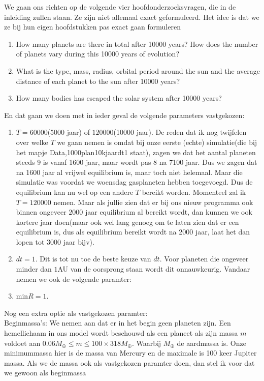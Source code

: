 \documentclass[11pt]{article}
\begin{document}
We gaan ons richten op de volgende vier hoofdonderzoeksvragen, die in de inleiding zullen staan. Ze zijn niet allemaal exact geformuleerd. Het idee is dat we ze bij hun eigen hoofdstukken pas exact gaan formuleren\\
\begin{enumerate}
	\item  How many planets are there in total after 10000 years? How does the number of planets vary during this 10000 years of evolution?

	\item What is the type, mass, radius, orbital period around the sun and the average distance of each planet to the sun after 10000 years?

	\item How many bodies has escaped the solar system after 10000 years?
\end{enumerate}
En dat gaan we doen met in ieder geval de volgende parameters vastgekozen:
\begin{enumerate}
\item $T=60000$(5000 jaar) of $120000$(10000 jaar). De reden dat ik nog twijfelen over welke $T$ we gaan nemen is omdat bij onze eerste (echte) simulatie(die bij het mapje Data,1000plan10kjaardt1 staat), zagen we dat het aantal planeten steeds 9 is vanaf 1600 jaar, maar wordt pas 8 na 7100 jaar. Dus we zagen dat na 1600 jaar al vrijwel equilibrium is, maar toch niet helemaal. Maar die simulatie was voordat we woensdag gasplaneten hebben toegevoegd. Dus de equilibrium kan nu wel op een andere $T$ bereikt worden. Momenteel zal ik $T=120000$ nemen. Maar als jullie zien dat er bij ons nieuw programma ook binnen ongeveer $2000$ jaar equilibrium al bereikt wordt, dan kunnen we ook kortere jaar doen(maar ook wel lang genoeg om te laten zien dat er een equilibrium is, dus als equilibrium bereikt wordt na 2000 jaar, laat het dan lopen tot 3000 jaar bijv).
\item $dt=1$. Dit is tot nu toe de beste keuze van $dt$. Voor planeten die ongeveer minder dan $1$AU van de oorsprong staan wordt dit onnauwkeurig. Vandaar nemen we ook de volgende paramter:
\item $\text{min}R=1$.
\end{enumerate}
Nog een extra optie als vastgekozen paramter:\\ 
Beginmassa's: We nemen aan dat er in het begin geen planeten zijn. Een hemellichaam in ons model wordt beschouwd als een planeet als zijn massa $m$ voldoet aan $0.06M_{\oplus}\leq m\leq 100\times 318M_{\oplus}$. Waarbij $M_{\oplus}$ de aardmassa is. Onze minimummassa hier is de massa van Mercury en de maximale is 100 keer Jupiter massa. Als we de massa ook als vastgekozen paramter doen, dan stel ik voor dat we gewoon als beginmassa
\end{document}
